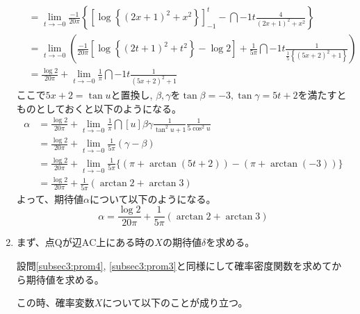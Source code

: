 \documentclass[dvipdfmx,titlepage, 11pt, a4paper]{jsarticle}%
\begin{document}
\begin{enumerate}[(1)]
\begin{align*}
        &= \lim_{t \to -0}\frac{-1}{20\pi}\left\{\left[\log\left\{\left(2x + 1\right)^2 + x^2\right\}\right]_{-1}^{t} - \dint{-1}{t}{\frac{4}{\left(2x + 1\right)^2 + x^2}}\right\}\\
        &= \lim_{t \to -0}\left(\frac{-1}{20\pi}\left[\log\left\{\left(2t + 1\right)^2 + t^2\right\} - \log 2\right] + \frac{1}{5\pi}\dint{-1}{t}{\frac{1}{\frac{1}{5}\left\{\left(5x + 2\right)^2 + 1\right\}}}\right)\\
        &= \frac{\log 2}{20\pi} + \lim_{t \to -0}\frac{1}{\pi}\dint{-1}{t}{\frac{1}{\left(5x + 2\right)^2 + 1}}
    \end{align*}
    ここで$5x + 2 = \tan u$と置換し, $\beta, \gamma$を$\tan\beta = -3, \tan\gamma = 5t + 2$を満たすとものとしておくと以下のようになる。
    \begin{align*}
        \alpha &= \frac{\log 2}{20\pi} + \lim_{t \to -0}\frac{1}{\pi}\dint[u]{\beta}{\gamma}{\frac{1}{\tan^{2}u+ 1}\frac{1}{5\cos^{2}u}}\\
        &= \frac{\log 2}{20\pi} + \lim_{t \to -0}\frac{1}{5\pi}(\gamma - \beta)\\
        &= \frac{\log 2}{20\pi} + \lim_{t \to -0}\frac{1}{5\pi}\bigl\{(\pi + \arctan(5t + 2)) - (\pi + \arctan(-3))\bigr\}\\
        &= \frac{\log 2}{20\pi} + \frac{1}{5\pi}(\arctan 2 + \arctan 3)
    \end{align*}
    よって、期待値$\alpha$について以下のようになる。
    \begin{equation}
        \alpha = \frac{\log 2}{20\pi} + \frac{1}{5\pi}(\arctan 2 + \arctan 3)\label{eq:subsec3:prom4:ans}
    \end{equation}
    \item まず、点$\mathrm{Q}$が辺$\mathrm{AC}$上にある時の$X$の期待値$\delta$を求める。
    
    設問\eqref{subsec3:prom4}, \eqref{subsec3:prom3}と同様にして確率密度関数を求めてから期待値を求める。

    この時、確率変数$X$について以下のことが成り立つ。
    

\end{enumerate}
\end{document}
